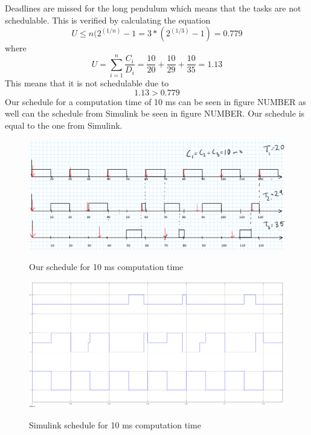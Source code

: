 \documentclass[12pt,a4paper]{article}
\begin{document}
    
Deadlines are missed for the long pendulum which means that the tasks are not schedulable. This is verified by calculating the equation
\begin{equation}
 U \le n(2^{(1/n)}-1 = 3*(2^{(1/3)}-1) = 0.779
\end{equation}
where
\begin{equation}
U = \sum\limits_{i=1}^n \frac{C_i}{D_i} = \frac{10}{20}+\frac{10}{29}+\frac{10}{35} = 1.13
\end{equation}
This means that it is not schedulable due to
\begin{equation}
1.13 > 0.779
\end{equation} 
Our schedule for a computation time of 10 ms can be seen in figure NUMBER as well can the schedule from Simulink be seen in figure NUMBER. Our schedule is equal to the one from Simulink.
\begin{center}
	\begin{figure}[H]
      \centering
	\includegraphics[scale=0.3]{ex541.png}
	\label{fig:ex541}
	\caption{Our schedule for 10 ms computation time}
	\end{figure}
\end{center}
\begin{center}
	\begin{figure}[H]
      \centering
	\includegraphics[scale=0.2]{ex542.png}
	\label{fig:ex541}
	\caption{Simulink schedule for 10 ms computation time}
	\end{figure}
\end{center}
\end{document}
